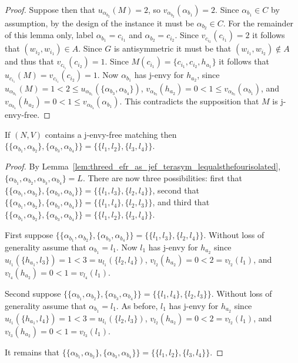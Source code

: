 \begin{proof}
Suppose then that $u_{\alpha_{b_2}}(M) = 2$, so $v_{\alpha_{b_2}}(\alpha_{b_1}) = 2$. Since $\alpha_{b_1} \in C$ by assumption, by the design of the instance it must be $\alpha_{b_2} \in C$. For the remainder of this lemma only, label $\alpha_{b_1} = c_{i_1}$ and $\alpha_{b_2} = c_{i_2}$. Since $v_{c_{i_2}}(c_{i_1}) = 2$ it follows that $( w_{i_2}, w_{i_1} ) \in A$. Since $G$ is antisymmetric it must be that $( w_{i_1}, w_{i_2} ) \notin A$ and thus that $v_{c_{i_1}}(c_{i_2}) = 1$. Since $M(c_{i_1}) = \{ c_{i_1}, c_{i_2}, h_{a_1} \}$ it follows that $u_{c_{i_1}}(M) = v_{c_{i_1}}(c_{i_2}) = 1$. Now $\alpha_{b_1}$ has j-envy for $h_{a_2}$, since $u_{\alpha_{b_1}}(M) = 1 < 2 \leq u_{\alpha_{b_1}}(\{ \alpha_{b_3}, \alpha_{b_4} \})$, $v_{\alpha_{b_3}}(h_{a_2}) = 0 < 1 \leq v_{\alpha_{b_3}}(\alpha_{b_1})$, and $v_{\alpha_{b_4}}(h_{a_2}) = 0 < 1 \leq v_{\alpha_{b_4}}(\alpha_{b_1})$. This contradicts the supposition that $M$ is j-envy-free.
\end{proof}

\begin{lem}
\label{lem:threed_efr_as_jef_terasym_structureofL}
If $(N, V)$ contains a j-envy-free matching then $\{ \{ \alpha_{b_1}, \alpha_{b_2} \}, \{ \alpha_{b_3}, \alpha_{b_4} \} \} = \{ \{ l_1, l_2 \}, \{ l_3, l_4 \} \}$.
\end{lem}
\begin{proof}
By Lemma~\ref{lem:threed_efr_as_jef_terasym_lequalsthefourisolated}, $\{ \alpha_{b_1}, \alpha_{b_2}, \alpha_{b_3}, \alpha_{b_4} \} = L$. There are now three possibilities: first that $\{ \{ \alpha_{b_1}, \alpha_{b_2} \}, \{ \alpha_{b_3}, \alpha_{b_4} \} \} = \{ \{ l_1, l_3 \}, \{ l_2, l_4 \} \}$, second that $\{ \{ \alpha_{b_1}, \alpha_{b_2} \}, \{ \alpha_{b_3}, \alpha_{b_4} \} \} = \{ \{ l_1, l_4 \}, \{ l_2, l_3 \} \}$, and third that $\{ \{ \alpha_{b_1}, \alpha_{b_2} \}, \{ \alpha_{b_3}, \alpha_{b_4} \} \} = \{ \{ l_1, l_2 \}, \{ l_3, l_4 \} \}$.

First suppose $\{ \{ \alpha_{b_1}, \alpha_{b_2} \}, \{ \alpha_{b_3}, \alpha_{b_4} \} \} = \{ \{ l_1, l_3 \}, \{ l_2, l_4 \} \}$. Without loss of generality assume that $\alpha_{b_1} = l_1$. Now $l_1$ has j-envy for $h_{a_2}$ since $u_{l_1}(\{ h_{a_1}, l_3 \}) = 1 < 3 = u_{l_1}(\{ l_2, l_4 \})$, $v_{l_2}(h_{a_2}) = 0 < 2 = v_{l_2}(l_1)$, and $v_{l_4}(h_{a_2}) = 0 < 1 = v_{l_4}(l_1)$.

Second suppose $\{ \{ \alpha_{b_1}, \alpha_{b_2} \}, \{ \alpha_{b_3}, \alpha_{b_4} \} \} = \{ \{ l_1, l_4 \}, \{ l_2, l_3 \} \}$. Without loss of generality assume that $\alpha_{b_1} = l_1$. As before, $l_1$ has j-envy for $h_{a_2}$ since $u_{l_1}(\{ h_{a_1}, l_4 \}) = 1 < 3 = u_{l_1}(\{ l_2, l_3 \})$, $v_{l_2}(h_{a_2}) = 0 < 2 = v_{l_2}(l_1)$, and $v_{l_3}(h_{a_2}) = 0 < 1 = v_{l_3}(l_1)$.

It remains that $\{ \{ \alpha_{b_1}, \alpha_{b_2} \}, \{ \alpha_{b_3}, \alpha_{b_4} \} \} = \{ \{ l_1, l_2 \}, \{ l_3, l_4 \} \}$.
\end{proof}

